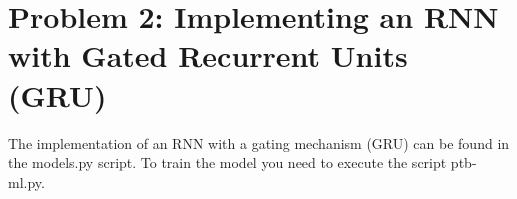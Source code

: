 \section{Problem 2: Implementing an RNN with Gated Recurrent Units (GRU)}

The implementation of an RNN with a gating mechanism (GRU) can be found in the models.py script. To train the model you need to execute the script ptb-ml.py.
